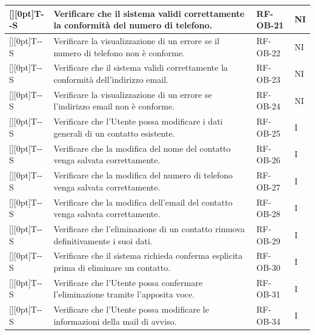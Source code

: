 \documentclass[a4paper,12pt]{article}
\newcounter{testsys}
\newcommand{\systestcode}{%
  \raisebox{0pt}[\height][0pt]{\hypertarget{T-\arabic{testsys}-S}{}}T-\arabic{testsys}-S%
}
\begin{document}
\begin{longtable}{| >{\centering\arraybackslash}p{} | >{\raggedright\arraybackslash}p{} | >{\centering\arraybackslash}p{} | >{\centering\arraybackslash}p{} |}
\stepcounter{testsys} \systestcode & Verificare che il sistema validi correttamente la conformità del numero di telefono. & RF-OB-21 & NI \\
\hline

\stepcounter{testsys} \systestcode & Verificare la visualizzazione di un errore se il numero di telefono non è conforme. & RF-OB-22 & NI \\
\hline

\stepcounter{testsys} \systestcode & Verificare che il sistema validi correttamente la conformità dell'indirizzo email. & RF-OB-23 & NI \\
\hline

\stepcounter{testsys} \systestcode & Verificare la visualizzazione di un errore se l'indirizzo email non è conforme. & RF-OB-24 & NI \\
\hline

\stepcounter{testsys} \systestcode & Verificare che l'Utente possa modificare i dati generali di un contatto esistente. & RF-OB-25 & I \\
\hline

\stepcounter{testsys} \systestcode & Verificare che la modifica del nome del contatto venga salvata correttamente. & RF-OB-26 & I \\
\hline

\stepcounter{testsys} \systestcode & Verificare che la modifica del numero di telefono venga salvata correttamente. & RF-OB-27 & I \\
\hline

\stepcounter{testsys} \systestcode & Verificare che la modifica dell'email del contatto venga salvata correttamente. & RF-OB-28 & I \\
\hline

\stepcounter{testsys} \systestcode & Verificare che l'eliminazione di un contatto rimuova definitivamente i suoi dati. & RF-OB-29 & I \\
\hline

\stepcounter{testsys} \systestcode & Verificare che il sistema richieda conferma esplicita prima di eliminare un contatto. & RF-OB-30 & I \\
\hline

\stepcounter{testsys} \systestcode & Verificare che l'Utente possa confermare l'eliminazione tramite l'apposita voce. & RF-OB-31 & I \\
\hline

\stepcounter{testsys} \systestcode & Verificare che l'Utente possa modificare le informazioni della mail di avviso. & RF-OB-34 & I \\
\hline


\end{longtable}
\end{document}

